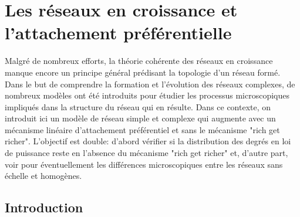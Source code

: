 \newcommand{\kms}{\textless k_s(t) \textgreater}
\newcommand{\kmss}{\textless k_s^2(t) \textgreater}

\chapter{Les réseaux en croissance et l'attachement préférentielle}

Malgré de nombreux efforts, la théorie cohérente des réseaux en croissance manque encore un principe général prédisant la topologie d'un réseau formé. Dans le but de comprendre la formation et l'évolution des réseaux complexes, de nombreux modèles ont été introduits pour étudier les processus microscopiques impliqués dans la structure du réseau qui en résulte. Dans ce contexte, on introduit ici un modèle de réseau simple et complexe qui augmente avec un mécanisme linéaire d'attachement préférentiel et sans le mécanisme "rich get richer". L'objectif est double: d'abord vérifier si la distribution des degrés en loi de puissance reste en l'absence du mécanisme "rich get richer" et, d'autre part, voir pour éventuellement les différences microscopiques entre les réseaux sans échelle et homogènes. 

\section{Introduction}

